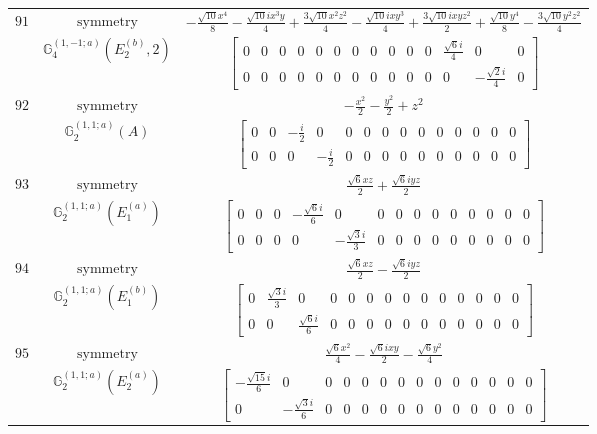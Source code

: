 \documentclass[fleqn,8pt,landscape]{jsarticle}
\begin{document}
\begin{longtable}{ccc}
$ 91 $ & $ \text{symmetry} $ & $ - \frac{\sqrt{10} x^{4}}{8} - \frac{\sqrt{10} i x^{3} y}{4} + \frac{3 \sqrt{10} x^{2} z^{2}}{4} - \frac{\sqrt{10} i x y^{3}}{4} + \frac{3 \sqrt{10} i x y z^{2}}{2} + \frac{\sqrt{10} y^{4}}{8} - \frac{3 \sqrt{10} y^{2} z^{2}}{4} $ \\
$  $ & $ \mathbb{G}_{4}^{(1,-1;a)}(E_{2}^{(b)},2) $ & $ \begin{bmatrix} 0 & 0 & 0 & 0 & 0 & 0 & 0 & 0 & 0 & 0 & 0 & \frac{\sqrt{6} i}{4} & 0 & 0 \\ 0 & 0 & 0 & 0 & 0 & 0 & 0 & 0 & 0 & 0 & 0 & 0 & - \frac{\sqrt{2} i}{4} & 0 \end{bmatrix} $ \\ \hline
$ 92 $ & $ \text{symmetry} $ & $ - \frac{x^{2}}{2} - \frac{y^{2}}{2} + z^{2} $ \\
$  $ & $ \mathbb{G}_{2}^{(1,1;a)}(A) $ & $ \begin{bmatrix} 0 & 0 & - \frac{i}{2} & 0 & 0 & 0 & 0 & 0 & 0 & 0 & 0 & 0 & 0 & 0 \\ 0 & 0 & 0 & - \frac{i}{2} & 0 & 0 & 0 & 0 & 0 & 0 & 0 & 0 & 0 & 0 \end{bmatrix} $ \\ \hline
$ 93 $ & $ \text{symmetry} $ & $ \frac{\sqrt{6} x z}{2} + \frac{\sqrt{6} i y z}{2} $ \\
$  $ & $ \mathbb{G}_{2}^{(1,1;a)}(E_{1}^{(a)}) $ & $ \begin{bmatrix} 0 & 0 & 0 & - \frac{\sqrt{6} i}{6} & 0 & 0 & 0 & 0 & 0 & 0 & 0 & 0 & 0 & 0 \\ 0 & 0 & 0 & 0 & - \frac{\sqrt{3} i}{3} & 0 & 0 & 0 & 0 & 0 & 0 & 0 & 0 & 0 \end{bmatrix} $ \\ \hline
$ 94 $ & $ \text{symmetry} $ & $ \frac{\sqrt{6} x z}{2} - \frac{\sqrt{6} i y z}{2} $ \\
$  $ & $ \mathbb{G}_{2}^{(1,1;a)}(E_{1}^{(b)}) $ & $ \begin{bmatrix} 0 & \frac{\sqrt{3} i}{3} & 0 & 0 & 0 & 0 & 0 & 0 & 0 & 0 & 0 & 0 & 0 & 0 \\ 0 & 0 & \frac{\sqrt{6} i}{6} & 0 & 0 & 0 & 0 & 0 & 0 & 0 & 0 & 0 & 0 & 0 \end{bmatrix} $ \\ \hline
$ 95 $ & $ \text{symmetry} $ & $ \frac{\sqrt{6} x^{2}}{4} - \frac{\sqrt{6} i x y}{2} - \frac{\sqrt{6} y^{2}}{4} $ \\
$  $ & $ \mathbb{G}_{2}^{(1,1;a)}(E_{2}^{(a)}) $ & $ \begin{bmatrix} - \frac{\sqrt{15} i}{6} & 0 & 0 & 0 & 0 & 0 & 0 & 0 & 0 & 0 & 0 & 0 & 0 & 0 \\ 0 & - \frac{\sqrt{3} i}{6} & 0 & 0 & 0 & 0 & 0 & 0 & 0 & 0 & 0 & 0 & 0 & 0 \end{bmatrix} $ \\ \hline

\end{longtable}
\end{document}
